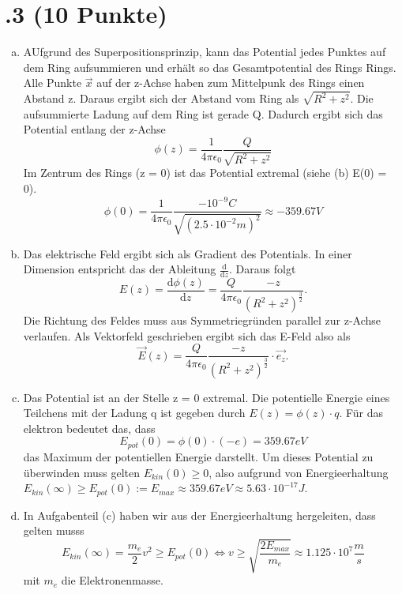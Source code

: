 \section*{\nr.3 \titthree (10 Punkte)}
\begin{enumerate}[(a)]
\item AUfgrund des Superpositionsprinzip, kann das Potential jedes Punktes auf dem Ring aufsummieren und erhält so das Gesamtpotential des Rings Rings. Alle Punkte $\vec{x} $ auf der z-Achse haben zum Mittelpunk des Rings einen Abstand z. Daraus ergibt sich der Abstand vom Ring als $\sqrt{R^2 + z^2}$. Die aufsummierte Ladung auf dem Ring ist gerade Q. Dadurch ergibt sich das Potential entlang der z-Achse
\begin{equation}
\phi(z) = \frac{1}{4\pi \epsilon_{0}} \frac{Q}{\sqrt{R^2 + z^2}}
\end{equation}
Im Zentrum des Rings (z = 0) ist das Potential extremal (siehe (b) E(0) = 0).
\begin{equation}
\phi(0) = \frac{1}{4\pi \epsilon_{0}} \frac{-10^{-9}C}{\sqrt{(2.5\cdot 10^{-2}m)^2}} \approx -359.67 V
\end{equation}
\item Das elektrische Feld ergibt sich als Gradient des Potentials. In einer Dimension entspricht das der Ableitung $\frac{\mathrm{d}}{\mathrm{d}z}$. Daraus folgt
\begin{equation}
E(z) = \frac{\mathrm{d}\phi (z)}{\mathrm{d}z}  = \frac{Q}{4\pi \epsilon_{0}} \frac{-z}{(R^2 + z^2)^{\frac{3}{2}}}.
\end{equation}
Die Richtung des Feldes muss aus Symmetriegründen parallel zur z-Achse verlaufen. Als Vektorfeld geschrieben ergibt sich das E-Feld also als
\begin{equation}
\vec{E}(z) = \frac{Q}{4\pi \epsilon_{0}} \frac{-z}{(R^2 + z^2)^{\frac{3}{2}}} \cdot \vec{e_{z}}.
\end{equation}
\item Das Potential ist an der Stelle z = 0 extremal. Die potentielle Energie eines Teilchens mit der Ladung q ist gegeben durch $E(z) = \phi(z) \cdot q$. Für das elektron bedeutet das, dass
\begin{equation}
E_{pot}(0) = \phi(0) \cdot (-e) = 359.67 eV
\end{equation}
das Maximum der potentiellen Energie darstellt. Um dieses Potential zu überwinden muss gelten $E_{kin}(0) \ge 0$, also aufgrund von Energieerhaltung $E_{kin}(\infty) \ge E_{pot}(0) := E_{max} \approx 359.67 eV \approx 5.63 \cdot 10^{-17} J$.
\item In Aufgabenteil (c) haben wir aus der Energieerhaltung hergeleiten, dass gelten musss
\begin{equation}
E_{kin}(\infty) = \frac{m_{e}}{2} v^2 \ge E_{pot}(0) \Leftrightarrow v \ge \sqrt{\frac{2E_{max}}{m_{e}}} \approx 1.125 \cdot 10^{7} \frac{m}{s}
\end{equation}
mit $m_{e}$ die Elektronenmasse.
\end{enumerate}
